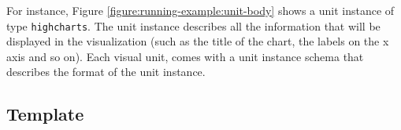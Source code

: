 For instance, Figure \ref{figure:running-example:unit-body} shows a unit instance of type \texttt{highcharts}. The unit instance describes all the information that will be displayed in the visualization (such as the title of the chart, the labels on the x axis and so on). Each visual unit, comes with a unit instance schema that describes the format of the unit instance.



\subsection{Template}
\label{section:template}


